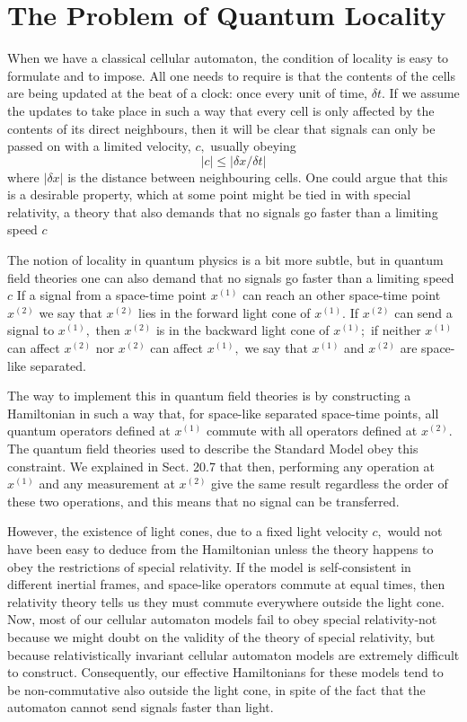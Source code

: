 \documentclass[main.tex]{subfiles}
\begin{document}
\begin{equation}\label{22.}
	
\end{equation}


\section{The Problem of Quantum Locality}\label{ch22}

When we have a classical cellular automaton, the condition of locality is easy to formulate and to impose. All one needs to require is that the contents of the cells are being updated at the beat of a clock: once every unit of time, $\delta t .$ If we assume the updates to take place in such a way that every cell is only affected by the contents of its direct neighbours, then it will be clear that signals can only be passed on with a limited velocity, $c,$ usually obeying
$$
|c| \leq|\delta x / \delta t|
$$
where $|\delta x|$ is the distance between neighbouring cells. One could argue that this is a desirable property, which at some point might be tied in with special relativity, a theory that also demands that no signals go faster than a limiting speed $c$

The notion of locality in quantum physics is a bit more subtle, but in quantum field theories one can also demand that no signals go faster than a limiting speed $c$ If a signal from a space-time point $x^{(1)}$ can reach an other space-time point $x^{(2)}$ we say that $x^{(2)}$ lies in the forward light cone of $x^{(1)} .$ If $x^{(2)}$ can send a signal to
$x^{(1)},$ then $x^{(2)}$ is in the backward light cone of $x^{(1)} ;$ if neither $x^{(1)}$ can affect $x^{(2)}$ nor $x^{(2)}$ can affect $x^{(1)},$ we say that $x^{(1)}$ and $x^{(2)}$ are space-like separated.

The way to implement this in quantum field theories is by constructing a Hamiltonian in such a way that, for space-like separated space-time points, all quantum operators defined at $x^{(1)}$ commute with all operators defined at $x^{(2)} .$ The quantum field theories used to describe the Standard Model obey this constraint. We explained in Sect. 20.7 that then, performing any operation at $x^{(1)}$ and any measurement at $x^{(2)}$ give the same result regardless the order of these two operations, and this means that no signal can be transferred.

However, the existence of light cones, due to a fixed light velocity $c,$ would not have been easy to deduce from the Hamiltonian unless the theory happens to obey the restrictions of special relativity. If the model is self-consistent in different inertial frames, and space-like operators commute at equal times, then relativity theory tells us they must commute everywhere outside the light cone. Now, most of our cellular automaton models fail to obey special relativity-not because we might doubt on the validity of the theory of special relativity, but because relativistically invariant cellular automaton models are extremely difficult to construct. Consequently, our effective Hamiltonians for these models tend to be non-commutative also outside the light cone, in spite of the fact that the automaton cannot send signals faster than light.
\end{document}
